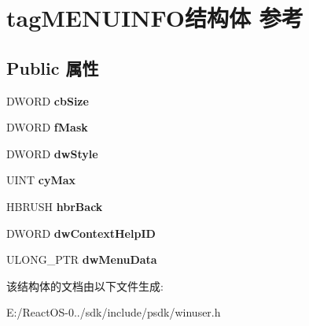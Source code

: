 \hypertarget{structtag_m_e_n_u_i_n_f_o}{}\section{tag\+M\+E\+N\+U\+I\+N\+F\+O结构体 参考}
\label{structtag_m_e_n_u_i_n_f_o}
\subsection*{Public 属性}
\begin{DoxyCompactItemize}
\item 
\mbox{\label{structtag_m_e_n_u_i_n_f_o_aa9ee3c0b48e9a09fd65c9c7a7d5a2abf}} 
D\+W\+O\+RD {\bfseries cb\+Size}
\item 
\mbox{\label{structtag_m_e_n_u_i_n_f_o_ab46de9cf71433ac2d835aae462287d37}} 
D\+W\+O\+RD {\bfseries f\+Mask}
\item 
\mbox{\label{structtag_m_e_n_u_i_n_f_o_a51199b347af7d36ade460e2095a0785d}} 
D\+W\+O\+RD {\bfseries dw\+Style}
\item 
\mbox{\label{structtag_m_e_n_u_i_n_f_o_a52a8970eb60ea3ad0f6e1a12dd5703dd}} 
U\+I\+NT {\bfseries cy\+Max}
\item 
\mbox{\label{structtag_m_e_n_u_i_n_f_o_a6946c6341bdd4be860a739a5fee86ab6}} 
H\+B\+R\+U\+SH {\bfseries hbr\+Back}
\item 
\mbox{\label{structtag_m_e_n_u_i_n_f_o_aec908f553a52b1f2caaa6299828dca64}} 
D\+W\+O\+RD {\bfseries dw\+Context\+Help\+ID}
\item 
\mbox{\label{structtag_m_e_n_u_i_n_f_o_a9f0b8316608b9426dff597edc67bf00a}} 
U\+L\+O\+N\+G\+\_\+\+P\+TR {\bfseries dw\+Menu\+Data}
\end{DoxyCompactItemize}


该结构体的文档由以下文件生成\+:\begin{DoxyCompactItemize}
\item 
E\+:/\+React\+O\+S-\/0../sdk/include/psdk/winuser.\+h\end{DoxyCompactItemize}
